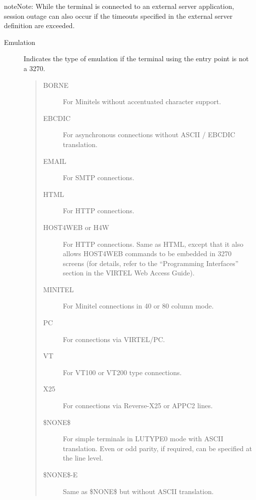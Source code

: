 \documentclass[letterpaper,10pt,english]{sphinxmanual}
\begin{document}
\begin{sphinxadmonition}{note}{Note:}
While the terminal is connected to an external server application, session outage can also occur if the timeouts specified in the external server definition are exceeded.
\end{sphinxadmonition}
\begin{description}
\item[{Emulation}] \leavevmode
Indicates the type of emulation if the terminal using the entry point is not a 3270.
\begin{quote}
\begin{description}
\item[{BORNE}] \leavevmode
For Minitels without accentuated character support.

\item[{EBCDIC}] \leavevmode
For asynchronous connections without ASCII / EBCDIC translation.

\item[{EMAIL}] \leavevmode
For SMTP connections.

\item[{HTML}] \leavevmode
For HTTP connections.

\item[{HOST4WEB or H4W}] \leavevmode
For HTTP connections. Same as HTML, except that it also allows HOST4WEB commands to be embedded in 3270 screens (for details, refer to the “Programming Interfaces” section in the VIRTEL Web Access Guide).

\item[{MINITEL}] \leavevmode
For Minitel connections in 40 or 80 column mode.

\item[{PC}] \leavevmode
For connections via VIRTEL/PC.

\item[{VT}] \leavevmode
For VT100 or VT200 type connections.

\item[{X25}] \leavevmode
For connections via Reverse-X25 or APPC2 lines.

\item[{\$NONE\$}] \leavevmode
For simple terminals in LUTYPE0 mode with ASCII translation. Even or odd parity, if required, can be specified at the line level.

\item[{\$NONE\$-E}] \leavevmode
Same as \$NONE\$ but without ASCII translation.

\end{description}
\end{quote}


\end{description}
\end{document}
